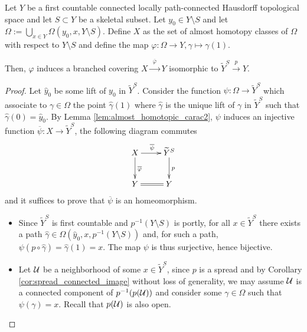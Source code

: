 \begin{thm} \label{theo:ramified_covering_path} Let $Y$ be a first countable connected locally path-connected Hausdorff topological space and let $S\subset Y$ be a skeletal subset. 
Let $y_0\in Y\setminus S$ and let $\Omega:=\bigcup_{x\in Y}\Omega(y_0,x,Y\setminus S)$. Define $X$ as the set of almost homotopy classes of $\Omega$ with respect to $Y\setminus S$ and define the map $\varphi:\Omega\rightarrow Y, \gamma \mapsto \gamma(1)$.


Then, $\varphi$ induces a branched covering $X \xrightarrow{~~\overline\varphi~~ } Y$  isomorphic to $\widetilde Y^S \xrightarrow{~~p~~} Y$.
 
\end{thm}
\begin{proof}

Let $\hat y_0$ be some lift of $y_0$ in $\widetilde Y^S$.
Consider the function $\psi : \Omega\rightarrow \widetilde Y^S$ which associate to $\gamma\in \Omega$ the point $\hat\gamma(1)$ where $\hat\gamma$ is the unique lift of $\gamma$ in $\widetilde Y^S$ such that $\hat\gamma(0)=\hat y_0$.
By Lemma \ref{lem:almost_homotopic_carac2}, $\psi$ induces an injective function $\overline \psi:X\rightarrow \widetilde Y^S$,
the following diagram commutes
$$\xymatrix{X\ar[d]^{\overline \varphi}\ar[r]^{\overline\psi}& \widetilde Y^S \ar[d]^p \\ Y\ar@{=}[r]&Y}$$
and it suffices to prove that $\overline \psi$ is an homeomorphism.

\begin{itemize}
 \item Since $\widetilde Y^S$ is first countable and $p^{-1}(Y\setminus S)$ is portly, for all $x\in \widetilde Y^S$ there exists a path $\hat\gamma\in \Omega(\hat y_0,x,p^{-1}(Y\setminus S))$ and, for such a path,  $\psi(p\circ \hat\gamma)=\hat\gamma(1)=x$. The map $\psi$ is thus surjective, hence bijective.
 
 \item Let $\mathcal{U}$ be a neighborhood of some $x\in \widetilde Y^S$, since $p$ is a spread and by Corollary \ref{cor:spread_connected_image} without loss of generality, we may assume $\mathcal{U}$ is a connected component of $p^{-1}(p(\mathcal{U}))$
 and consider some $\gamma\in \Omega$ such that $\psi(\gamma)=x$.  
 Recall that $p(\mathcal{U})$ is also open.
 

\end{itemize}
\end{proof}
